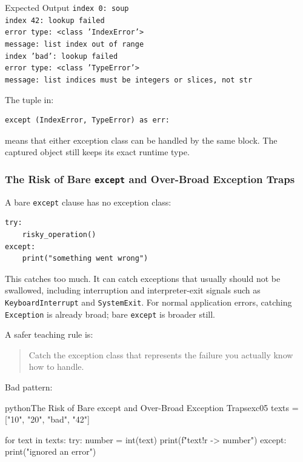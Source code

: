 \begin{iobox}{Expected Output}
\texttt{index 0: soup} \\
\texttt{index 42: lookup failed} \\
\texttt{error type: <class 'IndexError'>} \\
\texttt{message: list index out of range} \\
\texttt{index 'bad': lookup failed} \\
\texttt{error type: <class 'TypeError'>} \\
\texttt{message: list indices must be integers or slices, not str} \\
\end{iobox}


The tuple in:

\begin{verbatim}
except (IndexError, TypeError) as err:
\end{verbatim}

means that either exception class can be handled by the same block. The captured object still keeps its exact runtime type.

\subsubsection{The Risk of Bare \texttt{except} and Over-Broad Exception Traps}

A bare \texttt{except} clause has no exception class:

\begin{verbatim}
try:
    risky_operation()
except:
    print("something went wrong")
\end{verbatim}

This catches too much. It can catch exceptions that usually should not be swallowed, including interruption and interpreter-exit signals such as \texttt{KeyboardInterrupt} and \texttt{SystemExit}. For normal application errors, catching \texttt{Exception} is already broad; bare \texttt{except} is broader still.

A safer teaching rule is:

\begin{quote}
Catch the exception class that represents the failure you actually know how to handle.
\end{quote}

Bad pattern:

\begin{codebox}[]{python}{The Risk of Bare except and Over-Broad Exception Traps}{exc05}
texts = ["10", "20", "bad", "42"]

for text in texts:
    try:
        number = int(text)
        print(f"{text!r} -> {number}")
    except:
        print("ignored an error")
\end{codebox}


